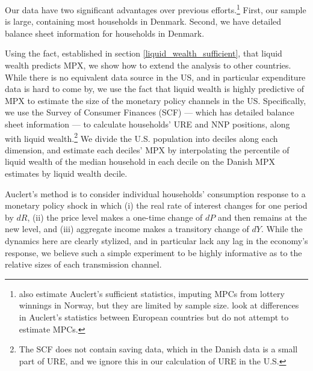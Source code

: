 \documentclass[titlepage]{\econtex}\newcommand{\texname}{ConsumptionHeterogeneity}
\begin{document}
	Our data have two significant advantages over previous efforts.\footnote{\cite{fagereng_mpc_2016} also estimate Auclert's sufficient statistics, imputing MPCs from lottery winnings in Norway, but they are limited by sample size. \cite{ampudia_monetary_2018} look at differences in Auclert's statistics between European countries but do not attempt to estimate MPCs.} First, our sample is large, containing most households in Denmark. Second, we have detailed balance sheet information for households in Denmark.
	
	Using the fact, established in section \ref{liquid_wealth_sufficient}, that liquid wealth predicts MPX, we show how to extend the analysis to other countries. While there is no equivalent data source in the US, and in particular expenditure data is hard to come by, we use the fact that liquid wealth is highly predictive of MPX to estimate the size of the monetary policy channels in the US. Specifically, we use the Survey of Consumer Finances (SCF) --- which has detailed balance sheet information --- to calculate households' URE and NNP positions, along with liquid wealth.\footnote{The SCF does not contain saving data, which in the Danish data is a small part of URE, and we ignore this in our calculation of URE in the U.S.} We divide the U.S. population into deciles along each dimension, and estimate each deciles' MPX by interpolating the percentile of liquid wealth of the median household in each decile on the Danish MPX estimates by liquid wealth decile.
	
	Auclert's method is to consider individual households' consumption response to a monetary policy shock in which (i) the real rate of interest changes for one period by $dR$, (ii) the price level makes a one-time change of $dP$ and then remains at the new level, and (iii) aggregate income makes a transitory change of $dY$. While the dynamics here are clearly stylized, and in particular lack any lag in the economy's response, we believe such a simple experiment to be highly informative as to the relative sizes of each transmission channel.
\end{document}
